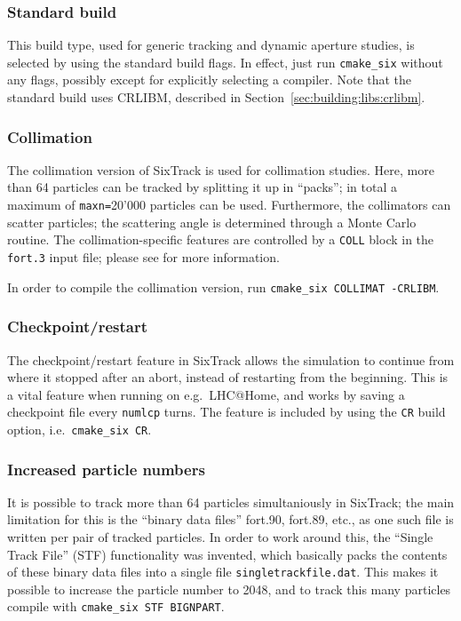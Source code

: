 \documentclass[english]{article}
\begin{document}
\subsubsection{Standard build}
This build type, used for generic tracking and dynamic aperture studies, is selected by using the standard build flags.
In effect, just run \texttt{cmake\_six} without any flags, possibly except for explicitly selecting a compiler.
Note that the standard build uses CRLIBM, described in Section~\ref{sec:building:libs:crlibm}.

\subsubsection{Collimation}
The collimation version of SixTrack is used for collimation studies.
Here, more than 64 particles can be tracked by splitting it up in ``packs''; in total a maximum of \texttt{maxn=}20'000 particles can be used.
Furthermore, the collimators can scatter particles; the scattering angle is determined through a Monte Carlo routine.
The collimation-specific features are controlled by a \texttt{COLL} block in the \texttt{fort.3} input file; please see  for more information.

In order to compile the collimation version, run \texttt{cmake\_six COLLIMAT -CRLIBM}.


\subsubsection{Checkpoint/restart}
The checkpoint/restart feature in SixTrack allows the simulation to continue from where it stopped after an abort, instead of restarting from the beginning.
This is a vital feature when running on e.g.\ LHC@Home, and works by saving a checkpoint file every \texttt{numlcp} turns.
The feature is included by using the \texttt{CR} build option, i.e.\ \texttt{cmake\_six CR}.

\subsubsection{Increased particle numbers}
It is possible to track more than 64 particles simultaniously in SixTrack; the main limitation for this is the ``binary data files'' fort.90, fort.89, etc., as one such file is written per pair of tracked particles.
In order to work around this, the ``Single Track File'' (STF) functionality was invented, which basically packs the contents of these binary data files into a single file \texttt{singletrackfile.dat}.
This makes it possible to increase the particle number to 2048, and to track this many particles compile with \texttt{cmake\_six STF BIGNPART}.
\end{document}
